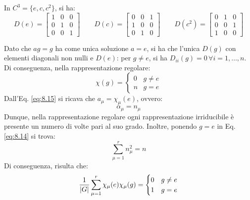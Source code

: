 \begin{example}
	In $ C^3 = \{e,c,c^2\} $, si ha:
	\begin{equation*}
		D(e) =
		\begin{bmatrix}
			1 & 0 & 0 \\
			0 & 1 & 0 \\
			0 & 0 & 1
		\end{bmatrix}
		\qquad
		D(c) =
		\begin{bmatrix}
			0 & 0 & 1 \\
			1 & 0 & 0 \\
			0 & 1 & 0
		\end{bmatrix}
		\qquad
		D(c^2) =
		\begin{bmatrix}
			0 & 1 & 0 \\
			0 & 0 & 1 \\
			1 & 0 & 0
		\end{bmatrix}
	\end{equation*}
\end{example}

Dato che $ ag = g $ ha come unica soluzione $ a = e $, si ha che l'unica $ D(g) $ con elementi diagonali non nulli e $ D(e) $: per $ g \neq e $, si ha $ D_{ii}(g) = 0 \,\forall i = 1, \dots, n $. Di conseguenza, nella rappresentazione regolare:
\begin{equation}
	\chi(g) =
	\begin{cases}
		0 & g \neq e \\
		n & g = e
	\end{cases}
	\label{eq:8.17}
\end{equation}
Dall'Eq. \ref{eq:8.15} si ricava che $ a_{\mu} = \chi_{\mu}(e) $, ovvero:
\begin{equation}
	\alpha_{\mu} = n_{\mu}
	\label{eq:8.18}
\end{equation}
Dunque, nella rappresentazione regolare ogni rappresentazione irriducibile è presente un numero di volte pari al suo grado. Inoltre, ponendo $ g = e $ in Eq. \ref{eq:8.14} si trova:
\begin{equation}
	\sum_{\mu = 1}^{r} n_{\mu}^2 = n
	\label{eq:8.19}
\end{equation}
Di conseguenza, risulta che:
\begin{equation}
	\frac{1}{\left\lvert G\right\rvert} \sum_{\mu = 1}^{r} \chi_{\mu}(e) \chi_{\mu}(g) =
	\begin{cases}
		0 & g \neq e \\
		1 & g = e
	\end{cases}
	\label{eq:8.20}
\end{equation}

